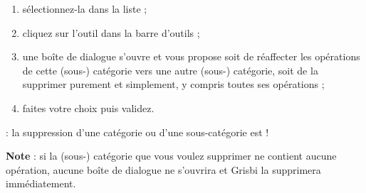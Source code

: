 \begin{enumerate}
	\ifIllustration
	\pichskip{8mm}
	\label{categories-delete-img}
	\fi
	 \item sélectionnez-la dans la liste ;
	 \item cliquez sur l'outil  dans la barre d'outils ;
	 \item une  boîte de dialogue s'ouvre et vous propose soit de réaffecter les opérations de cette (sous-) catégorie vers une autre (sous-) catégorie, soit de la supprimer purement et simplement, y compris toutes ses opérations ;
	 \item faites votre choix puis validez.
\end{enumerate}


\ifIllustration
\fi

 : la suppression d'une catégorie ou d'une sous-catégorie est  !

\textbf{Note} : si la (sous-) catégorie que vous voulez supprimer ne contient aucune opération, aucune boîte de dialogue ne s'ouvrira et Grisbi la supprimera immédiatement.

\ifIllustration
\fi


